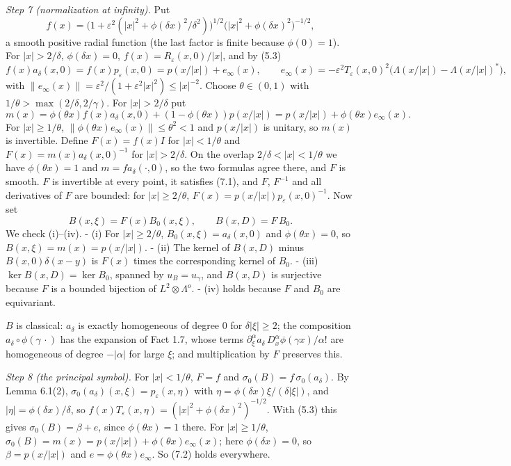 \documentclass[
  11pt,
]{article}
\begin{document}
\emph{Step 7 (normalization at infinity).} Put \[
f(x)=\bigl(1+\varepsilon^2(|x|^2+\phi(\delta x)^2/\delta^2)\bigr)^{1/2}\bigl(|x|^2+\phi(\delta x)^2\bigr)^{-1/2},
\] a smooth positive radial function (the last factor is finite because
\(\phi(0)=1\)). For \(|x|>2/\delta\), \(\phi(\delta x)=0\),
\(f(x)=R_\varepsilon(x,0)/|x|\), and by (5.3) \[
f(x)a_\delta(x,0)=f(x)p_\varepsilon(x,0)=p(x/|x|)+e_\infty(x),\qquad e_\infty(x)=-\varepsilon^2T_\varepsilon(x,0)^2\bigl(\Lambda(x/|x|)-\Lambda(x/|x|)^*\bigr),
\] with
\(\|e_\infty(x)\|=\varepsilon^2/(1+\varepsilon^2|x|^2)\le|x|^{-2}\).
Choose \(\theta\in(0,1)\) with \(1/\theta>\max(2/\delta,2/\gamma)\). For
\(|x|>2/\delta\) put \[
m(x)=\phi(\theta x)f(x)a_\delta(x,0)+(1-\phi(\theta x))p(x/|x|)=p(x/|x|)+\phi(\theta x)e_\infty(x).
\] For \(|x|\ge1/\theta\),
\(\|\phi(\theta x)e_\infty(x)\|\le\theta^2<1\) and \(p(x/|x|)\) is
unitary, so \(m(x)\) is invertible. Define \(F(x)=f(x)I\) for
\(|x|<1/\theta\) and \(F(x)=m(x)a_\delta(x,0)^{-1}\) for
\(|x|>2/\delta\). On the overlap \(2/\delta<|x|<1/\theta\) we have
\(\phi(\theta x)=1\) and \(m=fa_\delta(\cdot,0)\), so the two formulas
agree there, and \(F\) is smooth. \(F\) is invertible at every point, it
satisfies (7.1), and \(F\), \(F^{-1}\) and all derivatives of \(F\) are
bounded: for \(|x|\ge2/\theta\),
\(F(x)=p(x/|x|)p_\varepsilon(x,0)^{-1}\). Now set \[
B(x,\xi)=F(x)B_0(x,\xi),\qquad B(x,D)=F\,B_0 .
\] We check (i)--(iv). - (i) For \(|x|\ge2/\theta\),
\(B_0(x,\xi)=a_\delta(x,0)\) and \(\phi(\theta x)=0\), so
\(B(x,\xi)=m(x)=p(x/|x|)\). - (ii) The kernel of \(B(x,D)\) minus
\(B(x,0)\delta(x-y)\) is \(F(x)\) times the corresponding kernel of
\(B_0\). - (iii) \(\ker B(x,D)=\ker B_0\), spanned by \(u_B=u_\gamma\),
and \(B(x,D)\) is surjective because \(F\) is a bounded bijection of
\(L^2\otimes\Lambda^o\). - (iv) holds because \(F\) and \(B_0\) are
equivariant.

\(B\) is classical: \(a_\delta\) is exactly homogeneous of degree \(0\)
for \(\delta|\xi|\ge2\); the composition
\(a_\delta\circ\phi(\gamma\,\cdot)\) has the expansion of Fact 1.7,
whose terms
\(\partial_\xi^\alpha a_\delta\,D_x^\alpha\phi(\gamma x)/\alpha!\) are
homogeneous of degree \(-|\alpha|\) for large \(\xi\); and
multiplication by \(F\) preserves this.

\emph{Step 8 (the principal symbol).} For \(|x|<1/\theta\), \(F=f\) and
\(\sigma_0(B)=f\,\sigma_0(a_\delta)\). By Lemma 6.1(2),
\(\sigma_0(a_\delta)(x,\xi)=p_\varepsilon(x,\eta)\) with
\(\eta=\phi(\delta x)\xi/(\delta|\xi|)\), and
\(|\eta|=\phi(\delta x)/\delta\), so
\(f(x)T_\varepsilon(x,\eta)=(|x|^2+\phi(\delta x)^2)^{-1/2}\). With
(5.3) this gives \(\sigma_0(B)=\beta+e\), since \(\phi(\theta x)=1\)
there. For \(|x|\ge1/\theta\),
\(\sigma_0(B)=m(x)=p(x/|x|)+\phi(\theta x)e_\infty(x)\); here
\(\phi(\delta x)=0\), so \(\beta=p(x/|x|)\) and
\(e=\phi(\theta x)e_\infty\). So (7.2) holds everywhere.
\end{document}

